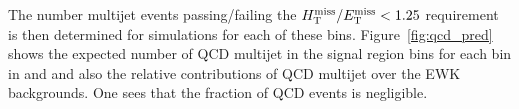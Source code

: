 

The number multijet events passing/failing the $\mbox{$\mbox{$H_{\rm T}^{\rm miss}$} / \mbox{$E_\text{T}^{\rm miss}$}$} < 1.25$ requirement is then determined for simulations for each
of these bins. Figure~\ref{fig:qcd_pred} shows the expected number of QCD multijet  in the signal region bins for each bin in \njet and \scalht and also the relative contributions of QCD multijet over the EWK backgrounds. One sees that the fraction of QCD events is negligible.

